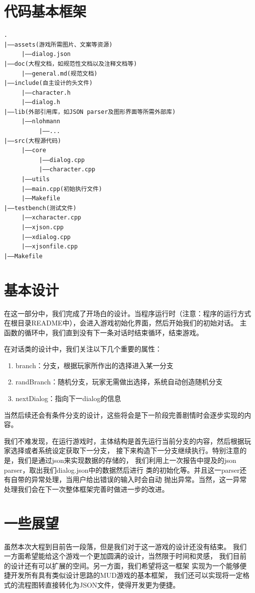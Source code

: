 \documentclass[UTF8]{ctexart}
\begin{document}
    \section{代码基本框架}
\begin{lstlisting}
.
|——assets(游戏所需图片、文案等资源)
     |——dialog.json
|——doc(大程文档，如规范性文档以及注释文档等)
     |——general.md(规范文档)
|——include(自主设计的头文件)
     |——character.h
     |——dialog.h
|——lib(外部引用库，如JSON parser及图形界面等所需外部库)
     |——nlohmann
          |——...
|——src(大程源代码)
     |——core
          |——dialog.cpp
          |——character.cpp
     |——utils
     |——main.cpp(初始执行文件)
     |——Makefile
|——testbench(测试文件)
     |——xcharacter.cpp
     |——xjson.cpp
     |——xdialog.cpp
     |——xjsonfile.cpp
|——Makefile
\end{lstlisting}
    
    \section{基本设计}
    在这一部分中，我们完成了开场白的设计。当程序运行时（注意：程序的运行方式
    在根目录README中），会进入游戏初始化界面，然后开始我们的初始对话。
    主函数的循环中，我们直到没有下一条对话时结束循环，结束游戏。

    在对话类的设计中，我们关注以下几个重要的属性：
    \begin{enumerate}
        \item branch：分支，根据玩家所作出的选择进入某一分支
        \item randBranch：随机分支，玩家无需做出选择，系统自动创造随机分支
        \item nextDialog：指向下一dialog的信息
    \end{enumerate}
    
    当然后续还会有条件分支的设计，这些将会是下一阶段完善剧情时会逐步实现的内容。

    我们不难发现，在运行游戏时，主体结构是首先运行当前分支的内容，然后根据玩家选择或者系统设定获取下一分支，
    接下来构造下一分支继续执行。特别注意的是，我们是通过json来实现数据的存储的，
    我们利用上一次报告中提及的json parser，取出我们dialog.json中的数据然后进行
    类的初始化等。并且这一parser还有自带的异常处理，当用户给出错误的输入时会自动
    抛出异常。当然，这一异常处理我们会在下一次整体框架完善时做进一步的改进。
    
    \section{一些展望}
    虽然本次大程到目前告一段落，但是我们对于这一游戏的设计还没有结束。
    我们一方面希望能给这个游戏一个更加圆满的设计，当然限于时间和灵感，
    我们目前的设计还有可以扩展的空间。另一方面，我们希望将这一框架
    实现为一个能够便捷开发所有具有类似设计思路的MUD游戏的基本框架，
    我们还可以实现将一定格式的流程图转直接转化为JSON文件，使得开发更为便捷。
\end{document}
